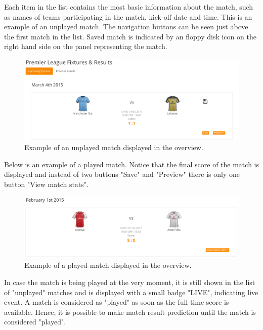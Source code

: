 Each item in the list contains the most basic information about the match, such as names of teams participating in the match, kick-off date and time. This is an example of an unplayed match. The navigation buttons can be seen just above the first match in the list. Saved match is indicated by an floppy disk icon on the right hand side on the panel representing the match.

\begin{figure}[H]
	\begin{center}
		\includegraphics[width=.90\linewidth,natwidth=610,natheight=642]{impl/images/unplayedMatch}
		\caption{Example of an unplayed match displayed in the overview.} \label{fig:using:unplayedmatch}
	\end{center}
\end{figure}

Below is an example of a played match. Notice that the final score of the match is displayed and instead of two buttons "Save" and "Preview" there is only one button "View match stats".

\begin{figure}[H]
	\begin{center}
		\includegraphics[width=.90\linewidth,natwidth=610,natheight=642]{impl/images/playedMatch}
		\caption{Example of a played match displayed in the overview.} \label{fig:using:playedmatch}
	\end{center}
\end{figure}

In case the match is being played at the very moment, it  is still shown in the list of "unplayed" matches and is displayed with a small badge "LIVE", indicating live event. A match is considered as "played" as soon as the full time score is available. Hence, it is possible to make match result prediction until the match is considered "played".

